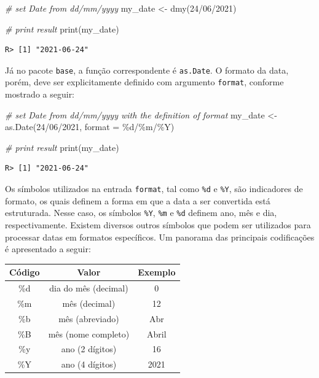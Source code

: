 \documentclass[
  11pt,
]{book}
\newenvironment{Shaded}{\begin{snugshade}}{\end{snugshade}}
\newcommand{\AttributeTok}[1]{\textcolor[rgb]{0.61,0.61,0.61}{#1}}
\newcommand{\CommentTok}[1]{\textcolor[rgb]{0.37,0.37,0.37}{\textit{#1}}}
\newcommand{\FunctionTok}[1]{\textcolor[rgb]{0,0,0}{#1}}
\newcommand{\NormalTok}[1]{#1}
\newcommand{\OtherTok}[1]{\textcolor[rgb]{0.37,0.37,0.37}{#1}}
\newcommand{\StringTok}[1]{\textcolor[rgb]{0.5,0.5,0.5}{#1}}
\begin{document}
\begin{Shaded}
\begin{Highlighting}[]
\CommentTok{\# set Date from dd/mm/yyyy}
\NormalTok{my\_date }\OtherTok{\textless{}{-}} \FunctionTok{dmy}\NormalTok{(}\StringTok{\textquotesingle{}24/06/2021\textquotesingle{}}\NormalTok{)}

\CommentTok{\# print result}
\FunctionTok{print}\NormalTok{(my\_date)}
\end{Highlighting}
\end{Shaded}

\begin{verbatim}
R> [1] "2021-06-24"
\end{verbatim}

Já no pacote \texttt{base}, a função correspondente é \texttt{as.Date}. O formato da data, porém, deve ser explicitamente definido com argumento \texttt{format}, conforme mostrado a seguir:

\begin{Shaded}
\begin{Highlighting}[]
\CommentTok{\# set Date from dd/mm/yyyy with the definition of format}
\NormalTok{my\_date }\OtherTok{\textless{}{-}} \FunctionTok{as.Date}\NormalTok{(}\StringTok{\textquotesingle{}24/06/2021\textquotesingle{}}\NormalTok{, }\AttributeTok{format =} \StringTok{\textquotesingle{}\%d/\%m/\%Y\textquotesingle{}}\NormalTok{)}

\CommentTok{\# print result}
\FunctionTok{print}\NormalTok{(my\_date)}
\end{Highlighting}
\end{Shaded}

\begin{verbatim}
R> [1] "2021-06-24"
\end{verbatim}

Os símbolos utilizados na entrada \texttt{format}, tal como \texttt{\%d} e \texttt{\%Y}, são indicadores de formato, os quais definem a forma em que a data a ser convertida está estruturada. Nesse caso, os símbolos \texttt{\%Y}, \texttt{\%m} e \texttt{\%d} definem ano, mês e dia, respectivamente. Existem diversos outros símbolos que podem ser utilizados para processar datas em formatos específicos. Um panorama das principais codificações é apresentado a seguir:

\begin{longtable}[]{@{}ccc@{}}
\toprule()
Código & Valor & Exemplo \\
\midrule()
\endhead
\%d & dia do mês (decimal) & 0 \\
\%m & mês (decimal) & 12 \\
\%b & mês (abreviado) & Abr \\
\%B & mês (nome completo) & Abril \\
\%y & ano (2 dígitos) & 16 \\
\%Y & ano (4 dígitos) & 2021 \\
\bottomrule()
\end{longtable}
\end{document}
